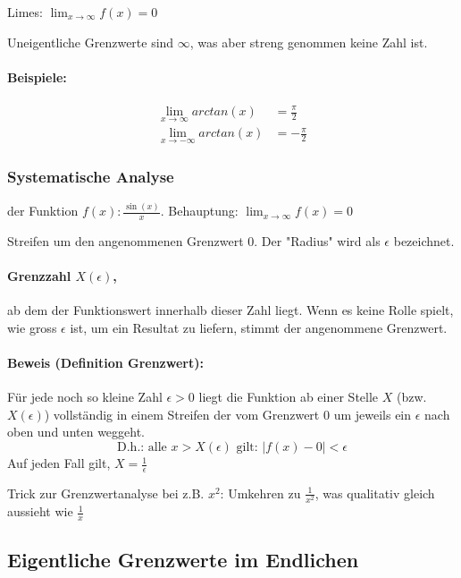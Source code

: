 Limes: $\lim_{x \rightarrow \infty}{f(x)} = 0$

Uneigentliche Grenzwerte sind $\infty$, was aber streng genommen keine Zahl ist.

\paragraph{Beispiele:}

\begin{align*}
	\lim_{x \to \infty}{arctan(x)} &= \frac{\pi}{2} \\
	\lim_{x \to -\infty}{arctan(x)} &= -\frac{\pi}{2}
\end{align*}

\subsubsection{Systematische Analyse}

der Funktion $f(x): \frac{\sin{(x)}}{x}$. Behauptung: $ \lim_{x \to \infty}{f(x)} = 0$

Streifen um den angenommenen Grenzwert 0. Der "Radius" wird als $\epsilon$ bezeichnet.

\paragraph{Grenzzahl $X(\epsilon)$,} ab dem der Funktionswert innerhalb dieser Zahl liegt. Wenn es keine Rolle spielt, wie gross $\epsilon$ ist, um ein Resultat zu liefern, stimmt der angenommene Grenzwert.

\paragraph{Beweis (Definition Grenzwert):} Für jede noch so kleine Zahl $\epsilon > 0$ liegt die Funktion ab einer Stelle $X$ (bzw. $X(\epsilon)$) vollständig in einem Streifen der vom Grenzwert $0$ um jeweils ein $\epsilon$ nach oben und unten weggeht.
\[
\text{D.h.:  alle } x > X(\epsilon) \text{ gilt: } |f(x)-0| < \epsilon
\]
Auf jeden Fall gilt, $X = \frac{1}{\epsilon}$

Trick zur Grenzwertanalyse bei z.B. $x^2$: Umkehren zu $\frac{1}{x^2}$, was qualitativ gleich aussieht wie $\frac{1}{x}$

\subsection{Eigentliche Grenzwerte im Endlichen}

